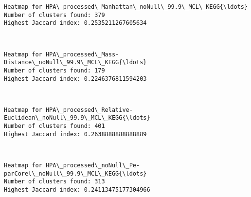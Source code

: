 \documentclass[11pt]{article}
\begin{document}
    \begin{Verbatim}[commandchars=\\\{\}]
Heatmap for HPA\_processed\_Manhattan\_noNull\_99.9\_MCL\_KEGG{\ldots}
Number of clusters found: 379
Highest Jaccard index: 0.2535211267605634

    \end{Verbatim}

    \begin{center}
    \end{center}
    { \hspace*{\fill} \\}
    
    \begin{Verbatim}[commandchars=\\\{\}]
Heatmap for HPA\_processed\_Mass-Distance\_noNull\_99.9\_MCL\_KEGG{\ldots}
Number of clusters found: 179
Highest Jaccard index: 0.2246376811594203

    \end{Verbatim}

    \begin{center}
    \end{center}
    { \hspace*{\fill} \\}
    
    \begin{Verbatim}[commandchars=\\\{\}]
Heatmap for HPA\_processed\_Relative-Euclidean\_noNull\_99.9\_MCL\_KEGG{\ldots}
Number of clusters found: 401
Highest Jaccard index: 0.2638888888888889

    \end{Verbatim}

    \begin{center}
    \end{center}
    { \hspace*{\fill} \\}
    
    \begin{Verbatim}[commandchars=\\\{\}]
Heatmap for HPA\_processed\_noNull\_Pe-parCorel\_noNull\_99.9\_MCL\_KEGG{\ldots}
Number of clusters found: 313
Highest Jaccard index: 0.24113475177304966

    \end{Verbatim}
\end{document}
